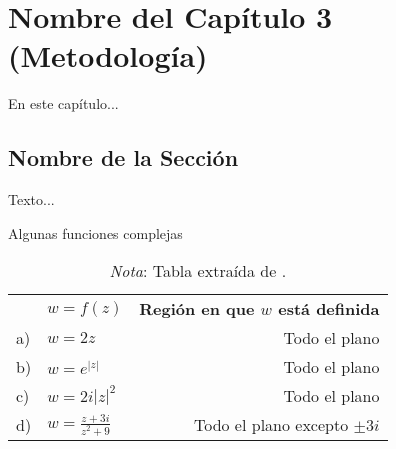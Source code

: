 \chapter{Nombre del Capítulo 3 (Metodología)}
\label{Metodologia}

\noindent En este capítulo...

\section{Nombre de la Sección} \label{EtiquetaDeSeccion31}
\noindent Texto...

\begin{table}[h!]
\caption{Algunas funciones complejas }
\centering
\begin{tabular}{ll|r}
	&\textbf{$w=f(z)$}&\textbf{Región en que $w$ está definida}\\
	\cline{2-3}
	a)&$\displaystyle w=2z$&Todo el plano\\
	\cline{2-3}
	b)&$\displaystyle w=e^{|z|}$&Todo el plano\\
	\cline{2-3}
	c)&$\displaystyle w=2i|z|^2$&Todo el plano\\
	\cline{2-3}
	d)&$\displaystyle w=\frac{z+3i}{z^2+9}$ &Todo el plano excepto $\pm 3i$
\end{tabular}
\label{EtiquetaDeLaTabla2}
\medskip
\caption*{\small  \emph{Nota}: Tabla extraída de \citet[p. 50]{WunschKEY}.}
\end{table}

